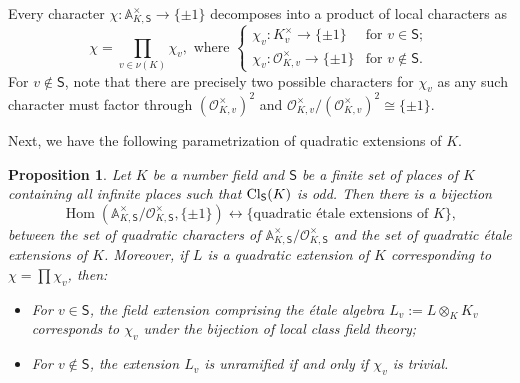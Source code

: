 \documentclass[10pt]{article}
\theoremstyle{plain}
\newtheorem{proposition}[thm]{Proposition}
\theoremstyle{definition}
\theoremstyle{remark}
\DeclareMathOperator{\Cl}{Cl}
\DeclareMathOperator{\Hom}{Hom}
\def\CS{{\mathsf S}}
\def\Cl{{\rm Cl}}
\def\bA{{\mathbb A}}
\def\O{{\mathcal O}}
\def\cO{{\mathcal O}}
\newcommand{\A}{\mathbb{A}}
\begin{document}
Every character $\chi:\A_{K,\CS}^\times\to\{\pm 1\}$ decomposes into a
product of local characters as
\begin{equation}\label{charlocprod}
 \chi=\prod_{v \in \nu(K)} \chi_v,\mbox{ where } \left\{
\begin{array}{lll}
  \chi_v:K_v^\times\to\{\pm 1\}      & \mbox{for } v\in \CS;\\[.05in]
  \chi_v:\O_{K,v}^\times\to\{\pm 1\}  & \mbox{for } v\not\in \CS.
\end{array}
\right.
\end{equation}
For $v\not\in \CS$, note that there are precisely two possible
characters for $\chi_v$ as any such character must factor through
$(\cO_{K,v}^\times)^2$ and
$\cO_{K,v}^\times/(\cO_{K,v}^\times)^2\cong \{\pm1\}$.  

Next, we have
the following parametrization of quadratic extensions of $K$.
\begin{proposition} \label{propbij}
Let $K$ be a number field and $\CS$ be a finite set of places of $K$
containing all infinite places such that $\Cl_\CS(K)$ is odd. Then
there is a bijection
\begin{equation*}
\Hom(\bA_{K,\CS}^\times/\cO_{K,\CS}^\times, \{\pm1\})
\longleftrightarrow \bigl\{\mbox{quadratic \'etale extensions of }
K\bigr\},
\end{equation*}
between the set of quadratic characters of
$\bA_{K,\CS}^\times/\cO_{K,\CS}^\times$ and the set of quadratic
\'etale extensions of $K$. Moreover, if $L$ is a quadratic extension
of $K$ corresponding to $\chi = \prod \chi_v$,
then:
\begin{itemize}
\item[{\rm (a)}] For $v\in\CS$, the field extension comprising the
  \'etale algebra $L_v:=L\otimes_K K_v$ corresponds to $\chi_v$ under
  the bijection of local class field theory;
\item[{\rm (b)}] For $v\not\in\CS$, the extension $L_v$ is unramified
  if and only if $\chi_v$ is trivial.
\end{itemize}
\end{proposition}
\end{document}
